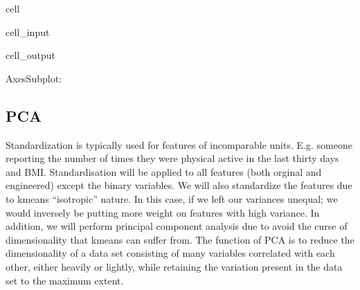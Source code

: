 \documentclass[letterpaper,10pt,english]{jupyterBook}
\begin{document}
\begin{sphinxuseclass}{cell}\begin{sphinxVerbatimInput}

\begin{sphinxuseclass}{cell_input}
\begin{sphinxVerbatim}[commandchars=\\\{\}]
\PYG{p}{[}\PYG{p}{]}   \PYG{p}{[}\PYG{p}{]}
\PYG{p}{[}\PYG{p}{]}
\end{sphinxVerbatim}

\end{sphinxuseclass}\end{sphinxVerbatimInput}
\begin{sphinxVerbatimOutput}

\begin{sphinxuseclass}{cell_output}
\begin{sphinxVerbatim}[commandchars=\\\{\}]
\PYGZlt{}AxesSubplot:\PYGZgt{}
\end{sphinxVerbatim}

\noindent{}

\end{sphinxuseclass}\end{sphinxVerbatimOutput}

\end{sphinxuseclass}

\subsection{PCA}
\label{\detokenize{Initial_Data_Exploration:pca}}
\sphinxAtStartPar
Standardization is typically used for features of incomparable units. E.g. someone reporting the number of times they were physical active in the last thirty days and BMI. Standardisation will be applied to all features (both orginal and engineered) except the binary variables. We will also standardize the features due to k\sphinxhyphen{}means “isotropic” nature. In this case, if we left our variances unequal; we would inversely be putting more weight on features with high variance. In addition, we will perform principal component analysis due to avoid the curse of dimensionality that k\sphinxhyphen{}means can suffer from. The function of PCA is to reduce the dimensionality of a data set consisting of many variables correlated with each other, either heavily or lightly, while retaining the variation present in the data set to the maximum extent.
\end{document}
